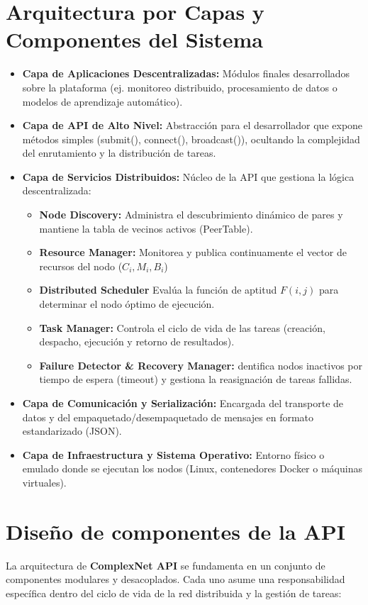 \documentclass{article}
\begin{document}
\section{Arquitectura por Capas y Componentes del Sistema}
\begin{itemize}
    \item \textbf{Capa de Aplicaciones Descentralizadas:} Módulos finales desarrollados sobre la plataforma (ej. monitoreo distribuido, procesamiento de datos o modelos de aprendizaje automático).
    \item \textbf{Capa de API de Alto Nivel: } Abstracción para el desarrollador que expone métodos simples (submit(), connect(), broadcast()), ocultando la complejidad del enrutamiento y la distribución de tareas.
    \item \textbf{Capa de Servicios Distribuidos: } Núcleo de la API que gestiona la lógica descentralizada:
        \begin{itemize}
            \item \textbf{Node Discovery:} Administra el descubrimiento dinámico de pares y mantiene la tabla de vecinos activos (PeerTable).
            \item \textbf{Resource Manager:} Monitorea y publica continuamente el vector de recursos del nodo ($C_i, M_i, B_i$)
            \item \textbf{Distributed Scheduler} Evalúa la función de aptitud $F(i,j)$ para determinar el nodo óptimo de ejecución.
            \item \textbf{Task Manager: } Controla el ciclo de vida de las tareas (creación, despacho, ejecución y retorno de resultados).
            \item \textbf{Failure Detector \& Recovery Manager:} dentifica nodos inactivos por tiempo de espera (timeout) y gestiona la reasignación de tareas fallidas.
        \end{itemize}
    \item \textbf{Capa de Comunicación y Serialización:} Encargada del transporte de datos  y del empaquetado/desempaquetado de mensajes en formato estandarizado (JSON).
    \item \textbf{Capa de Infraestructura y Sistema Operativo: } Entorno físico o emulado donde se ejecutan los nodos (Linux, contenedores Docker o máquinas virtuales).
\end{itemize}

\section{Diseño de componentes de la API}
La arquitectura de \textbf{ComplexNet API} se fundamenta en un conjunto de componentes modulares y desacoplados. Cada uno asume una responsabilidad específica dentro del ciclo de vida de la red distribuida y la gestión de tareas:
\end{document}
